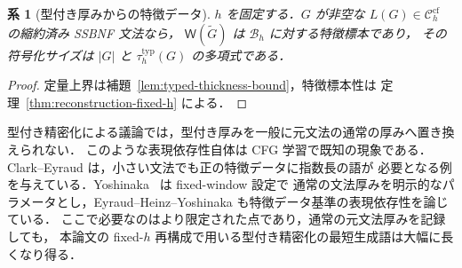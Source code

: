 \documentclass[11pt,a4paper]{ltjsarticle}
\newtheorem{corollary}[theorem]{系}
\theoremstyle{remark}
\theoremstyle{plain}
\newcommand{\WitnessSet}{\mathsf{W}}
\newcommand{\cf}{\mathrm{cf}}
\newcommand{\Ccf}[1]{\mathcal C_{#1}^{\cf}}
\begin{document}
\begin{corollary}[型付き厚みからの特徴データ]
\label{cor:typed-thickness-data}
$h$ を固定する．$G$ が非空な $L(G)\in\Ccf{h}$ の縮約済み SSBNF 文法なら，
$\WitnessSet(\widetilde G)$ は $\mathcal B_h$ に対する特徴標本であり，
その符号化サイズは $|G|$ と $\tau_h^{\mathrm{typ}}(G)$ の多項式である．
\end{corollary}
\begin{proof}
定量上界は補題~\ref{lem:typed-thickness-bound}，特徴標本性は
定理~\ref{thm:reconstruction-fixed-h} による．
\end{proof}

型付き精密化による議論では，型付き厚みを一般に元文法の通常の厚みへ置き換えられない．
このような表現依存性自体は CFG 学習で既知の現象である．Clark--Eyraud
\cite[Example~2]{clark-eyraud2007} は，小さい文法でも正の特徴データに指数長の語が
必要となる例を与えている．Yoshinaka~\cite{yoshinaka2008} は fixed-window 設定で
通常の文法厚みを明示的なパラメータとし，Eyraud--Heinz--Yoshinaka
\cite{eyraud-heinz-yoshinaka2016} も特徴データ基準の表現依存性を論じている．
ここで必要なのはより限定された点であり，通常の元文法厚みを記録しても，
本論文の fixed-$h$ 再構成で用いる型付き精密化の最短生成語は大幅に長くなり得る．
\end{document}
